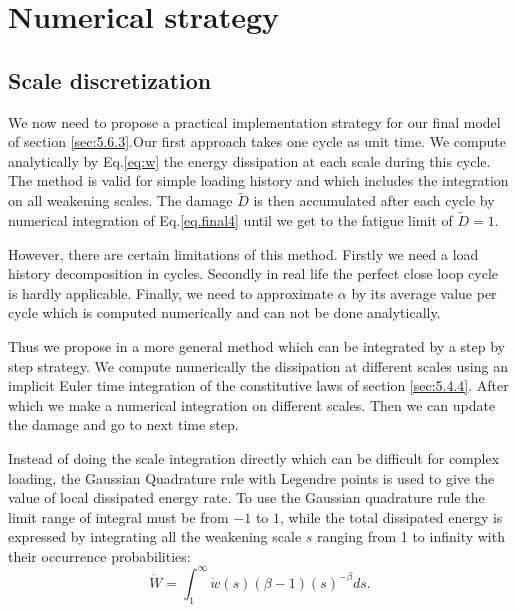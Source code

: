 \newpage
\section{Numerical strategy}
\label{sec:5.7}
\subsection{Scale discretization}
We now need to propose a practical implementation strategy for our final model of section \ref{sec:5.6.3}.Our first approach takes one cycle as unit time. We compute analytically by Eq.\eqref{eq:w} the energy dissipation at each scale during this cycle. The method is valid for simple loading history and which includes the integration on all weakening scales. The damage $\tilde{D}$ is then accumulated after each cycle by numerical integration of Eq.\eqref{eq.final4} until we get to the fatigue limit of $\tilde{D}=1$.

However, there are certain limitations of this method. Firstly we need a load history decomposition in cycles. Secondly in real life the perfect close loop cycle is hardly applicable. Finally, we need to approximate $\alpha$  by its average value per cycle which is computed numerically and can not be done analytically.

Thus we propose in a more general method which can be integrated by a step by step strategy. We compute numerically the dissipation at different scales using an implicit Euler time integration of the constitutive laws of section \ref{sec:5.4.4}. After which we make a numerical integration on different scales. Then we can update the damage and go to next time step. 

Instead of doing the scale integration directly which can be difficult for complex loading, the Gaussian Quadrature rule with Legendre points is used to give the value of local dissipated energy rate. To use the Gaussian quadrature rule the limit range of integral must be from $-1$ to $1$, while the total dissipated energy  is expressed by integrating all the weakening scale $s$ ranging from 1 to infinity with their occurrence probabilities:
$$\dot{W}=\int_{1}^{\infty}\dot{w}(s) (\beta-1)(s)^{-\beta}ds.$$

